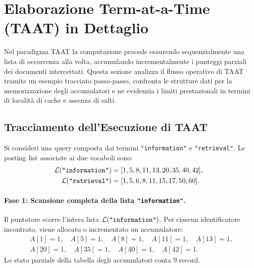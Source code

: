 \FloatBarrier
\section{Elaborazione Term-at-a-Time (TAAT) in Dettaglio}
\label{sec:taat-dettaglio}

Nel paradigma TAAT la computazione procede esaurendo sequenzialmente una lista di occorrenza alla volta, accumulando incrementalmente i punteggi parziali dei documenti intercettati. Questa sezione analizza il flusso operativo di TAAT tramite un esempio tracciato passo-passo, confronta le strutture dati per la memorizzazione degli accumulatori e ne evidenzia i limiti prestazionali in termini di localit\`a di cache e assenza di salti.

\FloatBarrier
\subsection{Tracciamento dell'Esecuzione di TAAT}
\label{subsec:tracciamento-taat}
Si consideri una query composta dai termini \texttt{"information"} e \texttt{"retrieval"}. Le posting list associate ai due vocaboli sono:
\begin{align*}
\mathcal{L}(\text{\texttt{"information"}}) &= [1, 5, 8, 11, 13, 20, 35, 40, 42], \\
\mathcal{L}(\text{\texttt{"retrieval"}}) &= [1, 5, 6, 8, 11, 15, 17, 50, 60].
\end{align*}

\paragraph{Fase 1: Scansione completa della lista \texttt{"information"}.}
Il puntatore scorre l'intera lista $\mathcal{L}(\text{\texttt{"information"}})$. Per ciascun identificatore incontrato, viene allocato o incrementato un accumulatore:
\begin{align*}
&A[1]=1, \quad A[5]=1, \quad A[8]=1, \quad A[11]=1, \quad A[13]=1, \\
&A[20]=1, \quad A[35]=1, \quad A[40]=1, \quad A[42]=1.
\end{align*}
Lo stato parziale della tabella degli accumulatori conta 9 record.


